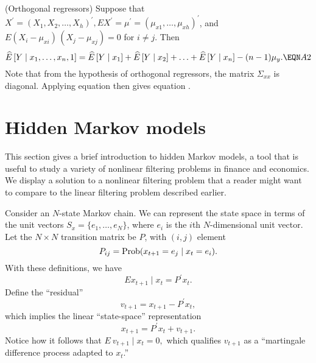  \quad (Orthogonal regressors)
\medskip \noindent
 Suppose that\hfil\break
$X^\prime = (X_1, X_2, \ldots, X_h)^\prime, EX^\prime= \mu^\prime = (\mu_{x1},
\ldots, \mu_{xh})^\prime$, and $E (X_i - \mu_{xi})\, (X_j-\mu_{xj}) = 0$
for $i \not= j$.  Then
$$\widehat E \, [Y \mid x_1,\ldots, x_n, 1] = \widehat E\,[Y \mid x_1]+\widehat
E\,[Y\mid x_2] + \ldots + \widehat E\, [Y\mid x_n]-(n-1) \mu_y . \EQN A2$$
\endtheorem
\medskip\noindent
\proof Note that from the hypothesis of orthogonal regressors, the
matrix $\Sigma_{xx}$ is diagonal.  Applying equation
 then gives equation . \endproof %
{}
\section{Hidden Markov models\label{sec:HMM}}
This section gives a brief introduction to hidden Markov models,
a tool that is useful to study a variety of nonlinear filtering
problems in finance and economics.  We display a solution to
a nonlinear filtering problem that a reader might want
to compare to the linear filtering problem described earlier.

    Consider an $N$-state Markov chain.   We can represent the
state space in terms of the unit vectors
$S_x = \{e_1,\ldots, e_N\}$, where $e_i$  is the $i$th
 $N$-dimensional unit vector.  Let the $N \times N$ transition
matrix be $P$, with $(i,j)$ element
$$P_{ij} = {\rm Prob}(x_{t+1} = e_j\mid x_t = e_i).$$
With these definitions, we have
$$E x_{t+1} \mid x_t = P^\prime x_t.$$
%
Define the ``residual''
$$v_{t+1} = x_{t+1} - P^\prime x_t,$$
which implies the linear ``state-space'' representation
$$x_{t+1} = P^\prime x_t + v_{t+1}.$$
Notice how it follows that
$E \ v_{t+1} \mid x_t = 0 ,$ which qualifies $v_{t+1}$ as a ``martingale
difference process adapted to $x_t$.''%

